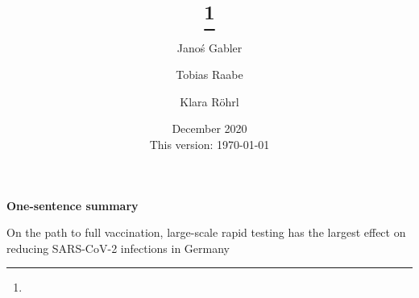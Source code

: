 

\title{\sffamily\bfseries%
	\papertitle%
	\thanks{\protect}%
}

\author[a, b]{Janoś Gabler}
\author[c]{Tobias Raabe}
\author[a]{Klara Röhrl}


\date{%
	\vfill%
	December 2020 \\
	This version: \today%
}

\maketitle

\vfill

\textbf{One-sentence summary}

On the path to full vaccination, large-scale rapid testing has the largest effect on reducing SARS-CoV-2 infections in Germany

\begin{abstract}%
	\!
\end{abstract}

\vfill

\clearpage
